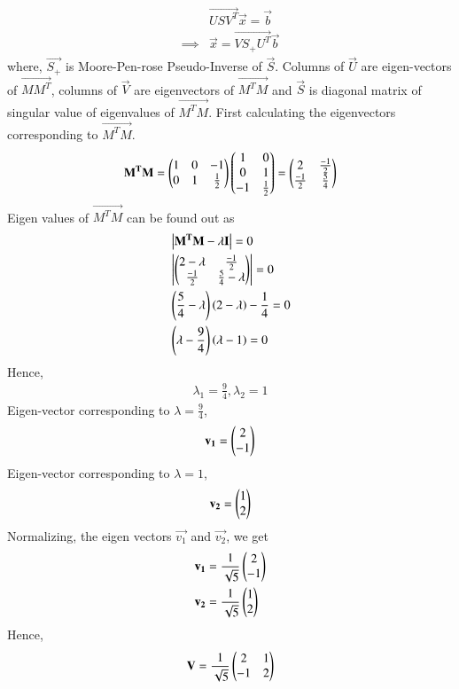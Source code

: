 \begin{align}
	&\vec{USV^T}\vec{x} = \vec{b} \\
\implies& \vec{x} = \vec{VS_+U^T}\vec{b}\label{eq:solutions/4/50/5/4}
\end{align}
where, $\vec{S_+}$ is Moore-Pen-rose Pseudo-Inverse of $\vec{S}$. Columns of $\vec{U}$ are eigen-vectors of $\vec{MM^T}$, columns of $\vec{V}$ are eigenvectors of $\vec{M^TM}$ and $\vec{S}$ is diagonal matrix of singular value of eigenvalues of $\vec{M^TM}$. First calculating the eigenvectors corresponding to $\vec{M^TM}$.
\begin{align}
\mathbf{M^TM} = \begin{pmatrix}1 & 0 & -1 \\ 0 & 1 & \frac{1}{2} \end{pmatrix} \begin{pmatrix}1 & 0 \\ 0 & 1 \\ -1 & \frac{1}{2}\end{pmatrix} = \begin{pmatrix}2 & \frac{-1}{2} \\ \frac{-1}{2} & \frac{5}{4}\end{pmatrix}
\end{align}
Eigen values of $\vec{M^TM}$ can be found out as
\begin{align}
	& \left\vert\mathbf{M^TM-\lambda I}\right\vert = 0 \\
	& \left\vert\begin{pmatrix}2-\lambda & \frac{-1}{2} \\ \frac{-1}{2} & \frac{5}{4} -\lambda\end{pmatrix}\right\vert = 0 \\
	& \left(\frac{5}{4}-\lambda\right)\left(2-\lambda\right) - \frac{1}{4} = 0 \\
	& \left(\lambda-\frac{9}{4}\right)\left(\lambda-1\right) = 0 
\end{align}
Hence,
\begin{align}
\lambda_1 = \frac{9}{4}, \lambda_2 = 1
\end{align}
Eigen-vector corresponding to $\lambda=\frac{9}{4}$,
\begin{align}
\mathbf{v_1} = \begin{pmatrix}2 \\ -1\end{pmatrix} 
\end{align}
Eigen-vector corresponding to $\lambda = 1$,
\begin{align}
\mathbf{v_2} = \begin{pmatrix}1 \\ 2\end{pmatrix}
\end{align}
Normalizing, the eigen vectors $\vec{v_1}$ and $\vec{v_2}$, we get
\begin{align}
& \mathbf{v_1} = \frac{1}{\sqrt{5}}\begin{pmatrix}2 \\ -1\end{pmatrix} \\
& \mathbf{v_2} = \frac{1}{\sqrt{5}}\begin{pmatrix}1 \\ 2\end{pmatrix} 
\end{align}
Hence,
\begin{align}
	\mathbf{V} = \frac{1}{\sqrt{5}}\begin{pmatrix}2 & 1 \\ -1 & 2 \end{pmatrix} \label{eq:solutions/4/50/5/5}
\end{align}
